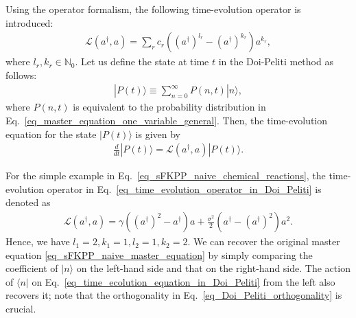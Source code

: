\documentclass[sn-mathphys,Numbered]{sn-jnl}%
\theoremstyle{thmstyleone}%
\theoremstyle{thmstyletwo}%
\theoremstyle{thmstylethree}%
\begin{document}
Using the operator formalism, the following time-evolution operator is introduced:
\begin{align}
\mathcal{L} (a^\dagger,a) = \sum_r c_r \left( \left(a^\dagger\right)^{l_r} - \left(a^\dagger\right)^{k_r} \right) a^{k_r},
\label{eq_time_evolution_operator_in_Doi_Peliti}
\end{align}
where $l_r, k_r \in \mathbb{N}_0$. Let us define the state at time $t$ in the Doi-Peliti method as follows:
\begin{align}
| P(t) \rangle \equiv \sum_{n=0}^\infty P(n,t) | n \rangle,
\label{eq_state_in_Doi_Peliti}
\end{align}
where $P(n,t)$ is equivalent to the probability distribution in Eq.~\eqref{eq_master_equation_one_variable_general}. Then, the time-evolution equation for the state $|P(t)\rangle$ is given by
\begin{align}
\frac{d}{dt} | P(t) \rangle = \mathcal{L} (a^\dagger,a) | P(t) \rangle.
\label{eq_time_ecolution_equation_in_Doi_Peliti}
\end{align}


For the simple example in Eq.~\eqref{eq_sFKPP_naive_chemical_reactions}, the time-evolution operator in Eq.~\eqref{eq_time_evolution_operator_in_Doi_Peliti} is denoted as
\begin{align}
\mathcal{L}(a^\dagger, a) = \gamma \left(\left(a^\dagger\right)^2 - a^\dagger\right) a + \frac{\sigma^2}{2} \left(a^\dagger - \left(a^\dagger\right)^2 \right) a^2.
\end{align}
Hence, we have $l_1 = 2, k_1 = 1, l_2 = 1, k_2 = 2$. We can recover the original master equation \eqref{eq_sFKPP_naive_master_equation} by simply comparing the coefficient of $| n \rangle$ on the left-hand side and that on the right-hand side. The action of $\langle n |$ on Eq.~\eqref{eq_time_ecolution_equation_in_Doi_Peliti} from the left also recovers it; note that the orthogonality in Eq.~\eqref{eq_Doi_Peliti_orthogonality} is crucial.
\end{document}
